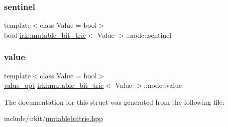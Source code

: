 \mbox{\label{structirk_1_1mutable__bit__trie_1_1node_a54f76adb0cab3a380ba75cc039065e4d}} 
\subsubsection{\texorpdfstring{sentinel}{sentinel}}
{\footnotesize\ttfamily template$<$class Value = bool$>$ \\
bool \mbox{\hyperlink{classirk_1_1mutable__bit__trie}{irk\+::mutable\+\_\+bit\+\_\+trie}}$<$ Value $>$\+::node\+::sentinel}

\mbox{\label{structirk_1_1mutable__bit__trie_1_1node_a1bacc998d6276431578e9ecb8f3dfa59}} 
\subsubsection{\texorpdfstring{value}{value}}
{\footnotesize\ttfamily template$<$class Value = bool$>$ \\
\mbox{\hyperlink{classirk_1_1mutable__bit__trie_a7a1b77766d10fe2d02bb2ce01983f153}{value\+\_\+opt}} \mbox{\hyperlink{classirk_1_1mutable__bit__trie}{irk\+::mutable\+\_\+bit\+\_\+trie}}$<$ Value $>$\+::node\+::value}



The documentation for this struct was generated from the following file\+:\begin{DoxyCompactItemize}
\item 
include/irkit/\mbox{\hyperlink{mutablebittrie_8hpp}{mutablebittrie.\+hpp}}\end{DoxyCompactItemize}
